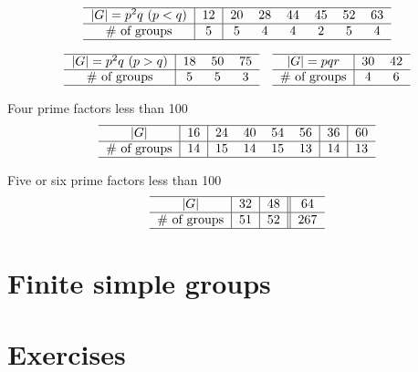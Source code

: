\documentclass{../../large}
\begin{document}
\begin{prb}
\end{prb}






\[\begin{tabular}{c|c|ccccccc}
\hline
$|G|=p^2q\ (p<q)$&12&20&28&44&45&52&63\\
\hline
$\#$ of groups&5&5&4&4&2&5&4\\
\hline
\end{tabular}\]

\[\begin{tabular}{c|cccc}
\hline
$|G|=p^2q\ (p>q)$&18&50&75\\
\hline
$\#$ of groups&5&5&3\\
\hline
\end{tabular}
\hspace{10pt}
\begin{tabular}{c|cc}
\hline
$|G|=pqr$&30&42\\
\hline
$\#$ of groups&4&6\\
\hline
\end{tabular}\]

Four prime factors less than 100
\[\begin{tabular}{c|c|cccc|c|c}
\hline
$|G|$&16&24&40&54&56&36&60\\
\hline
$\#$ of groups&14&15&14&15&13&14&13\\
\hline
\end{tabular}\]

Five or six prime factors less than 100
\[\begin{tabular}{c|c|c||c}
\hline
$|G|$&32&48&64\\
\hline
$\#$ of groups&51&52&267\\
\hline
\end{tabular}\]


\section{Finite simple groups}






\section*{Exercises}
\begin{prb}
\end{prb}
\end{document}
